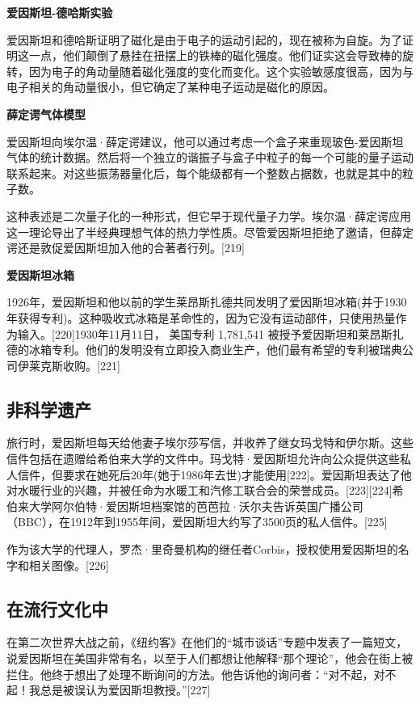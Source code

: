 \textbf{爱因斯坦-德哈斯实验}

爱因斯坦和德哈斯证明了磁化是由于电子的运动引起的，现在被称为自旋。为了证明这一点，他们颠倒了悬挂在扭摆上的铁棒的磁化强度。他们证实这会导致棒的旋转，因为电子的角动量随着磁化强度的变化而变化。这个实验敏感度很高，因为与电子相关的角动量很小，但它确定了某种电子运动是磁化的原因。

\textbf{薛定谔气体模型}

爱因斯坦向埃尔温·薛定谔建议，他可以通过考虑一个盒子来重现玻色-爱因斯坦气体的统计数据。然后将一个独立的谐振子与盒子中粒子的每一个可能的量子运动联系起来。对这些振荡器量化后，每个能级都有一个整数占据数，也就是其中的粒子数。

这种表述是二次量子化的一种形式，但它早于现代量子力学。埃尔温·薛定谔应用这一理论导出了半经典理想气体的热力学性质。尽管爱因斯坦拒绝了邀请，但薛定谔还是敦促爱因斯坦加入他的合著者行列。[219]

\textbf{爱因斯坦冰箱}

1926年，爱因斯坦和他以前的学生莱昂斯扎德共同发明了爱因斯坦冰箱(并于1930年获得专利)。这种吸收式冰箱是革命性的，因为它没有运动部件，只使用热量作为输入。[220]1930年11月11日， 美国专利 1,781,541 被授予爱因斯坦和莱昂斯扎德的冰箱专利。他们的发明没有立即投入商业生产，他们最有希望的专利被瑞典公司伊莱克斯收购。[221]

\subsection{非科学遗产}
旅行时，爱因斯坦每天给他妻子埃尔莎写信，并收养了继女玛戈特和伊尔斯。这些信件包括在遗赠给希伯来大学的文件中。玛戈特·爱因斯坦允许向公众提供这些私人信件，但要求在她死后20年(她于1986年去世)才能使用[222]。爱因斯坦表达了他对水暖行业的兴趣，并被任命为水暖工和汽修工联合会的荣誉成员。[223][224]希伯来大学阿尔伯特·爱因斯坦档案馆的芭芭拉·沃尔夫告诉英国广播公司（BBC），在1912年到1955年间，爱因斯坦大约写了3500页的私人信件。[225]

作为该大学的代理人，罗杰·里奇曼机构的继任者Corbis，授权使用爱因斯坦的名字和相关图像。[226]

\subsection{在流行文化中}
在第二次世界大战之前，《纽约客》在他们的“城市谈话”专题中发表了一篇短文，说爱因斯坦在美国非常有名，以至于人们都想让他解释“那个理论”，他会在街上被拦住。他终于想出了处理不断询问的方法。他告诉他的询问者：“对不起，对不起！我总是被误认为爱因斯坦教授。”[227]

